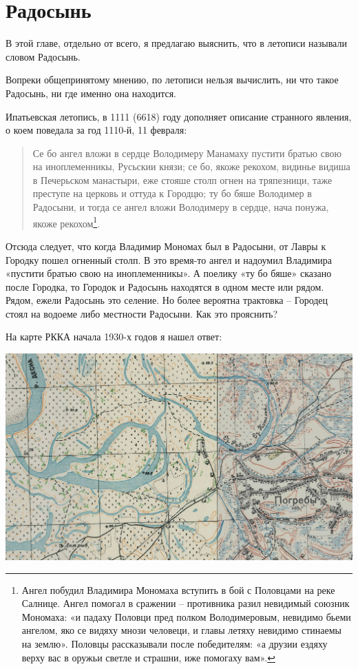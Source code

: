 \chapter{Радосынь}

В этой главе, отдельно от всего, я предлагаю выяснить, что в летописи называли словом Радосынь.

Вопреки общепринятому мнению, по летописи нельзя вычислить, ни что такое Радосынь, ни где именно она находится.

Ипатьевская летопись, в 1111 (6618) году дополняет описание странного явления, о коем поведала за год 1110-й, 11 февраля:

\begin{quotation}
Се бо ангел вложи в сердце Володимеру Манамаху пустити братью свою на иноплеменникы, Русьскии князи; се бо, якоже рекохом, видинье видиша в Печерьском манастыри, еже стояше столп огнен на тряпезници, таже преступе на церковь и оттуда к Городцю; ту бо бяше Володимер в Радосыни, и тогда се ангел вложи Володимеру в сердце, нача понужа, якоже рекохом\footnote{Ангел побудил Владимира Мономаха вступить в бой с Половцами на реке Салнице. Ангел помогал в сражении – противника разил невидимый союзник Мономаха: «и падаху Половци пред полком Володимеровым, невидимо бьеми ангелом, яко се видяху мнози человеци, и главы летяху невидимо стинаемы на землю». Половцы рассказывали после победителям: «а друзии ездяху верху вас в оружьи светле и страшни, иже помогаху вам».}.
\end{quotation}

Отсюда следует, что когда Владимир Мономах был в Радосыни, от Лавры к Городку пошел огненный столп. В это время-то ангел и надоумил Владимира «пустити братью свою на иноплеменникы». А поелику «ту бо бяше» сказано после Городка, то Городок и Радосынь находятся в одном месте или рядом. Рядом, ежели Радосынь это селение. Но более вероятна трактовка – Городец стоял на водоеме либо местности Радосыни. Как это прояснить?

На карте РККА начала 1930-х годов я нашел ответ:

\begin{center}
\includegraphics[width=\linewidth]{chast-gorodki/radosyn/radosen-big.jpg}
\end{center}

